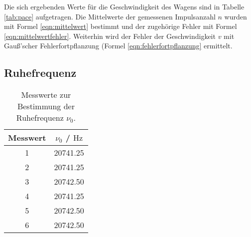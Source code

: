 Die sich ergebenden Werte für die Geschwindigkeit des Wagens sind in Tabelle \ref{tab:pace}
aufgetragen. Die Mittelwerte der gemessenen Impulsanzahl $n$ wurden mit Formel
\eqref{eqn:mittelwert} bestimmt und der zugehörige Fehler mit Formel
\eqref{eqn:mittelwertfehler}. Weiterhin wird der Fehler der Geschwindigkeit $v$ mit
Gauß'scher Fehlerfortpflanzung (Formel \eqref{eqn:fehlerfortpflanzung} ermittelt.



\FloatBarrier
\subsection{Ruhefrequenz}
\begin{table}
	\centering
	\caption{Messwerte zur Bestimmung der Ruhefrequenz $\nu_0$.}
	\label{tab:ruhefr}
	\begin{tabular}{cc}
		\toprule
		Messwert & $\nu_0$ / $\si{\hertz}$ \\
		\midrule
		1        & 20741.25                \\
		2        & 20741.25                \\
		3        & 20742.50                \\
		4        & 20741.25                \\
		5        & 20742.50                \\
		6        & 20742.50                \\
		\bottomrule
	\end{tabular}
\end{table}
\FloatBarrier
